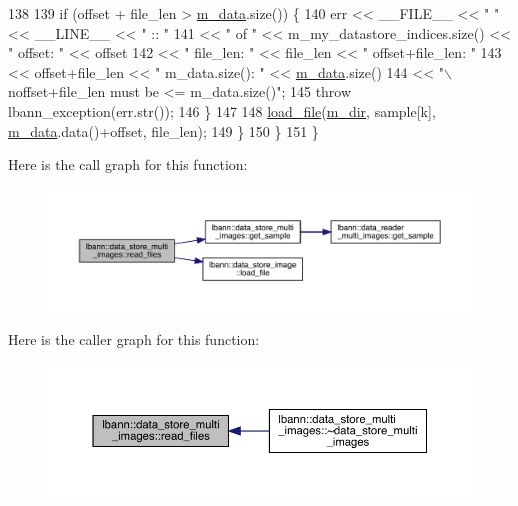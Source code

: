 \begin{DoxyCode}
138 
139       \textcolor{keywordflow}{if} (offset + file\_len > \hyperlink{classlbann_1_1data__store__image_a10e9aa0c240785bc0a961f24e87a1c16}{m\_data}.size()) \{
140         err << \_\_FILE\_\_ << \textcolor{stringliteral}{" "} << \_\_LINE\_\_ << \textcolor{stringliteral}{" :: "} 
141           << \textcolor{stringliteral}{" of "} << m\_my\_datastore\_indices.size() << \textcolor{stringliteral}{" offset: "} << offset
142           << \textcolor{stringliteral}{" file\_len: "} << file\_len << \textcolor{stringliteral}{" offset+file\_len: "}
143           << offset+file\_len << \textcolor{stringliteral}{" m\_data.size(): "} << \hyperlink{classlbann_1_1data__store__image_a10e9aa0c240785bc0a961f24e87a1c16}{m\_data}.size()
144           << \textcolor{stringliteral}{"\(\backslash\)noffset+file\_len must be <= m\_data.size()"};
145         \textcolor{keywordflow}{throw} lbann\_exception(err.str());
146       \}  
147 
148       \hyperlink{classlbann_1_1data__store__image_a8a53bab58d75554821f90c38d14078aa}{load\_file}(\hyperlink{classlbann_1_1generic__data__store_ab479c127f00ce550c7433b90e40a5a3d}{m\_dir}, sample[k], \hyperlink{classlbann_1_1data__store__image_a10e9aa0c240785bc0a961f24e87a1c16}{m\_data}.data()+offset, file\_len);
149     \}
150   \}
151 \}
\end{DoxyCode}
Here is the call graph for this function\+:\nopagebreak
\begin{figure}[H]
\begin{center}
\leavevmode
\includegraphics[width=350pt]{classlbann_1_1data__store__multi__images_a8ce8ccf3c7b0d19adfb838108bec075b_cgraph}
\end{center}
\end{figure}
Here is the caller graph for this function\+:\nopagebreak
\begin{figure}[H]
\begin{center}
\leavevmode
\includegraphics[width=350pt]{classlbann_1_1data__store__multi__images_a8ce8ccf3c7b0d19adfb838108bec075b_icgraph}
\end{center}
\end{figure}
\mbox{\label{classlbann_1_1data__store__multi__images_a7b5e9ec7b7132872299a204d5d24ee62}} 
